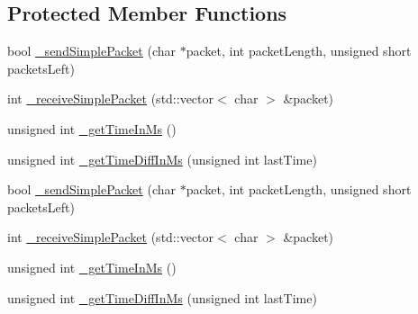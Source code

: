 \subsection*{Protected Member Functions}
\begin{DoxyCompactItemize}
\item 
bool \hyperlink{classCSocketInConnection_a5e8b5ab5a00b3975327d17120c8ddd47}{\+\_\+send\+Simple\+Packet} (char $\ast$packet, int packet\+Length, unsigned short packets\+Left)
\item 
int \hyperlink{classCSocketInConnection_a7f8d909d68c1ecebed43ecdf252a0a97}{\+\_\+receive\+Simple\+Packet} (std\+::vector$<$ char $>$ \&packet)
\item 
unsigned int \hyperlink{classCSocketInConnection_aa2f27fe4555b6e37decf4cedb9ee22f1}{\+\_\+get\+Time\+In\+Ms} ()
\item 
unsigned int \hyperlink{classCSocketInConnection_a39b91ba3a715175ba1ad65f441da0564}{\+\_\+get\+Time\+Diff\+In\+Ms} (unsigned int last\+Time)
\item 
bool \hyperlink{classCSocketInConnection_a5e8b5ab5a00b3975327d17120c8ddd47}{\+\_\+send\+Simple\+Packet} (char $\ast$packet, int packet\+Length, unsigned short packets\+Left)
\item 
int \hyperlink{classCSocketInConnection_a7f8d909d68c1ecebed43ecdf252a0a97}{\+\_\+receive\+Simple\+Packet} (std\+::vector$<$ char $>$ \&packet)
\item 
unsigned int \hyperlink{classCSocketInConnection_aa2f27fe4555b6e37decf4cedb9ee22f1}{\+\_\+get\+Time\+In\+Ms} ()
\item 
unsigned int \hyperlink{classCSocketInConnection_a39b91ba3a715175ba1ad65f441da0564}{\+\_\+get\+Time\+Diff\+In\+Ms} (unsigned int last\+Time)
\end{DoxyCompactItemize}

